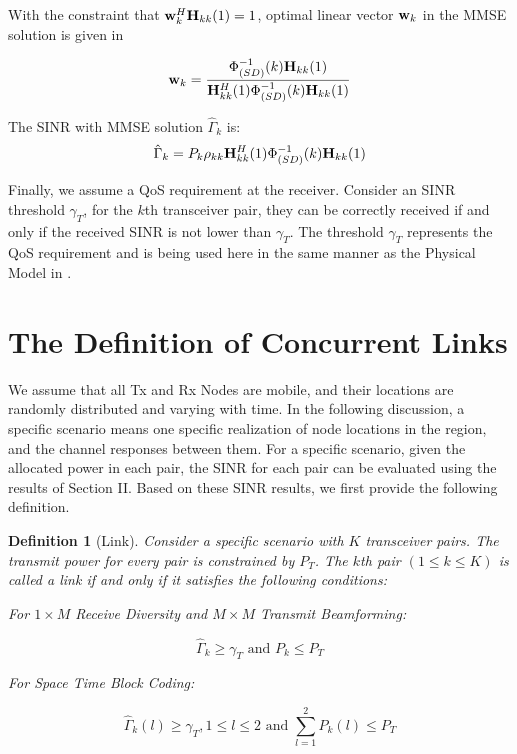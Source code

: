 \documentclass[draftcls,onecolumn,peerview,12pt]{IEEEtran}
\begin{document}
With the constraint that ${\rm{\bf w}}_k^H{\rm{\bf H}}_{kk}(1)=1$,
optimal linear vector ${\rm{\bf w}}_k$ in the MMSE solution is given
in \cite{13_JointOptimal1998, 20_MMSE, 21_Spatial_Multiplexing}

\begin{equation}
\label{eqn_11} {\rm{\bf w}}_k=\frac{\Phi_{(SD)}^{-1}(k){\rm{\bf
H}}_{kk}(1)}{{\rm{\bf H}}_{kk}^{H}(1)\Phi_{(SD)}^{-1}(k){\rm{\bf
H}}_{kk}(1)}
\end{equation}



The SINR with MMSE solution $\hat{\Gamma}_k$ is:
\begin{equation}
\hat{\Gamma}_k = P_k \rho_{kk}{\rm{\bf H}}_{kk}^{H}(1)
\Phi_{(SD)}^{-1}(k){\rm{\bf H}}_{kk}(1)
\end{equation}

Finally, we assume a QoS requirement at the receiver. Consider an
SINR threshold $\gamma_T$, for the $k$th transceiver pair, they can
be correctly received if and only if the received SINR is not lower
than $\gamma_T$. The threshold $\gamma_T$ represents the QoS
requirement and is being used here in the same manner as the
Physical Model in \cite{16_Gupta2000}.

\section{The Definition of Concurrent Links}
We assume that all Tx and Rx Nodes are mobile, and their locations
are randomly distributed and varying with time. In the following
discussion, a specific scenario means one specific realization of
node locations in the region, and the channel responses between
them. For a specific scenario, given the allocated power in each
pair, the SINR for each pair can be evaluated using the results of
Section II. Based on these SINR results, we first provide the
following definition.
\newtheorem{definition}{Definition}
\begin{definition}[Link]
Consider a specific scenario with $K$ transceiver pairs. The
transmit power for every pair is constrained by $P_T$. The $k$th
pair $(1\leq k \leq K)$ is called a \textit{link} if and only if it
satisfies the following conditions:

For $1 \times M$ Receive Diversity and $M \times M$ Transmit
Beamforming:

\begin{equation}
\hat{\Gamma}_k\geq \gamma_T \textrm{ and } P_k \leq P_T
\end{equation}

For Space Time Block Coding:

\begin{equation}
\hat{\Gamma}_k(l)\geq \gamma_T, 1 \leq l \leq 2 \textrm{ and }
\sum\limits_{l=1}^{2}P_k(l)\leq P_T
\end{equation}
\end{definition}
\end{document}
